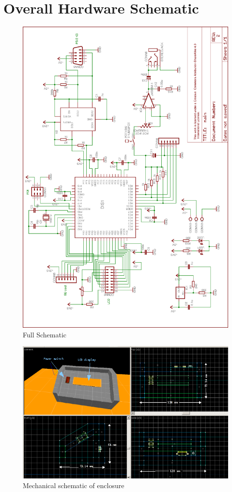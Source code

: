 \documentclass[bibtotocnumbered,abstract=on,paper=a4,fontsize=12pt,parskip=on,halfparskip=on]{scrartcl}		%
\begin{document}
\section{Overall Hardware Schematic}
    \begin{figure}[H]
      \centering
        \includegraphics[width=0.9\linewidth]{img/fig_full_schematic}
        \caption{Full Schematic}
    \end{figure}
    \clearpage
      \begin{figure}[H]
        \centering
          \includegraphics[width=\linewidth]{img/fig_mechanical0}
          \caption{Mechanical schematic of enclosure}
          \label{fig:3d1}
      \end{figure}
\end{document}
